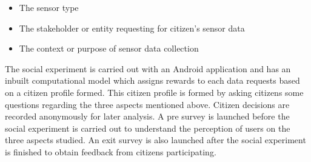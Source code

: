 \begin{itemize}
\item The sensor type
\item The stakeholder or entity requesting for citizen's sensor data
\item The context or purpose of sensor data collection
\end{itemize} 

The social experiment is carried out with an Android application and has an inbuilt computational model which assigns rewards to each data requests based on a citizen profile formed. This citizen profile is formed by asking citizens some questions regarding the three aspects mentioned above. Citizen decisions are recorded anonymously for later analysis. A pre survey is launched before the social experiment is carried out to understand the perception of users on the three aspects studied. An exit survey is also launched after the social experiment is finished to obtain feedback from citizens participating. 




